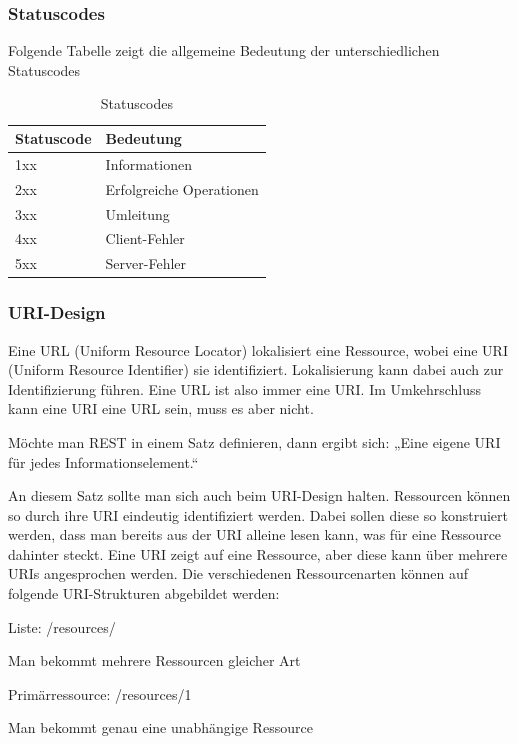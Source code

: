 \subsubsection{Statuscodes}
\label{sec:RESTStatuscodes}

Folgende Tabelle zeigt die allgemeine Bedeutung der unterschiedlichen Statuscodes

\begin{table}
	\begin{tabular}{ | l | l | }
		\hline
		Statuscode & Bedeutung \\ \hline
		1xx & Informationen \\ \hline
		2xx & Erfolgreiche Operationen \\ \hline
		3xx & Umleitung \\ \hline
		4xx & Client-Fehler \\ \hline
		5xx & Server-Fehler \\ \hline
	\end{tabular}
	\caption{Statuscodes}
\end{table}


\subsubsection{URI-Design}
\label{sec:RESTURI-Design}

Eine URL (Uniform Resource Locator) lokalisiert eine Ressource, wobei eine URI (Uniform
Resource Identifier) sie identifiziert. Lokalisierung kann dabei auch zur Identifizierung führen.
Eine URL ist also immer eine URI. Im Umkehrschluss kann eine URI eine URL sein, muss es
aber nicht.

Möchte man REST in einem Satz definieren, dann ergibt sich: „Eine eigene URI für jedes
Informationselement.“ \cite{.j}\cite{Tilkov.2015b}

An diesem Satz sollte man sich auch beim URI-Design halten. Ressourcen können so durch
ihre URI eindeutig identifiziert werden. Dabei sollen diese so konstruiert werden, dass man
bereits aus der URI alleine lesen kann, was für eine Ressource dahinter steckt. Eine URI zeigt
auf eine Ressource, aber diese kann über mehrere URIs angesprochen werden.
Die verschiedenen Ressourcenarten können auf folgende URI-Strukturen abgebildet werden:

Liste: /resources/

Man bekommt mehrere Ressourcen gleicher Art

Primärressource: /resources/1

Man bekommt genau eine unabhängige Ressource

